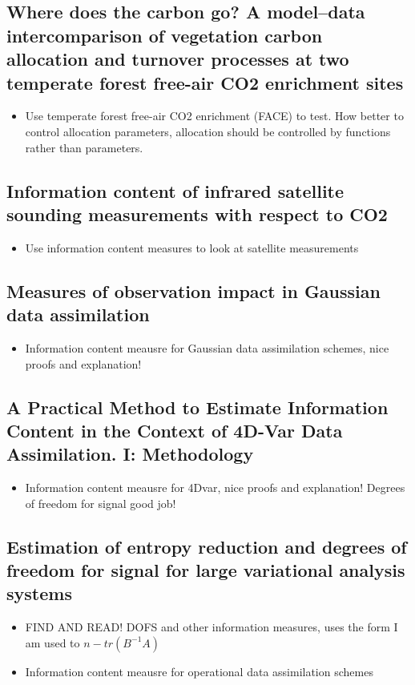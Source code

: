 \documentclass[11pt]{article}
\begin{document}
\subsection*{Where does the carbon go? A model--data intercomparison of vegetation carbon allocation and turnover processes at two temperate forest free-air CO2 enrichment sites \cite{de2014does}}
\begin{itemize}
\item Use temperate forest free-air CO2 enrichment (FACE) to test. How better to control allocation parameters, allocation should be controlled by functions rather than parameters.
\end{itemize}


\subsection*{Information content of infrared satellite sounding measurements with respect to CO2 \cite{engelen2004information}}
\begin{itemize}
\item Use information content measures to look at satellite measurements
\end{itemize}


\subsection*{Measures of observation impact in Gaussian data assimilation \cite{fowler2011measures}}
\begin{itemize}
\item Information content meausre for Gaussian data assimilation schemes, nice proofs and explanation!
\end{itemize}


\subsection*{A Practical Method to Estimate Information Content in the Context of 4D-Var Data Assimilation. I: Methodology \cite{sandu2012practical}}
\begin{itemize}
\item Information content meausre for 4Dvar, nice proofs and explanation! Degrees of freedom for signal good job!
\end{itemize}


\subsection*{Estimation of entropy reduction and degrees of freedom for signal for large variational analysis systems \cite{fisher2003estimation}}
\begin{itemize}
\item FIND AND READ! DOFS and other information measures, uses the form I am used to $n - tr(B^{-1}A)$
\item Information content meausre for operational data assimilation schemes
\end{itemize}


{}

\end{document}
